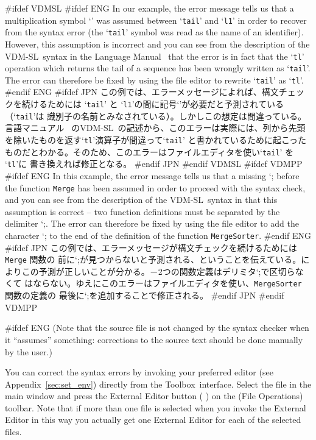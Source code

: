 \documentclass[\pformat,12pt]{article}
\newcommand{\vdmslpp}{VDM-SL}
\newcommand{\Toolbox}{Toolbox}
\newcommand{\vdmslpp}{VDM++}
\newcommand{\Toolbox}{Toolbox}
\newcommand{\Lit}[1]{`#1\Quote}
\newcommand{\aaa}{\tt }
\newcommand{\guicmd}[1]{{\sf #1}}
\newcommand{\guicmd}[1]{{\gt #1}}
\begin{document}
#ifdef VDMSL
#ifdef ENG
In our example, the error message tells us that a multiplication symbol
`{\tt*}' was assumed between `{\tt tail}' and `{\tt l1}' in order to
recover from the syntax error (the `{\tt tail}' symbol was read as the
name of an identifier). However, this assumption is incorrect and  you
can see from the  description of the \vdmslpp\ syntax in the Language
Manual~\cite{LangMan-CSK} that the error is in fact that the `{\tt tl}'
operation which returns the tail of a sequence has been wrongly
written as `{\tt tail}'. The error can therefore be fixed by using the
file editor to rewrite `{\tt tail}' as `{\tt tl}'.
#endif ENG
#ifdef JPN
この例では、エラーメッセージによれば、構文チェックを続けるためには
`{\tt tail}' と `{\tt l1}'の間に記号`{\tt*}'が必要だと予測されている（`{\tt tail}'は
識別子の名前とみなされている）。しかしこの想定は間違っている。言語マニュアル~\cite{LangMan-CSK} 
の\vdmslpp\ の記述から、このエラーは実際には、列から先頭を除いたものを返す`{\tt tl}'演算子が間違って`{\tt tail}'
と書かれているために起こったものだとわかる。そのため、このエラーはファイルエディタを使い`{\tt tail}' を `{\tt tl}'に
書き換えれば修正となる。
#endif JPN
#endif VDMSL
#ifdef VDMPP
#ifdef ENG
In this example, the error message tells us that a missing \Lit{;}
before the function {\aaa Merge} has been assumed in order to proceed
with the syntax check, and you can see from the  description of the
\vdmslpp\ syntax in \cite{LangManPP-CSK} that this assumption is correct
-- two function definitions must be separated by the delimiter
\Lit{;}. The error can therefore be fixed by using the file editor to
add the character \Lit{;} to the end of the definition of the function
{\aaa MergeSorter}.
#endif ENG
#ifdef JPN
この例では、エラーメッセージが構文チェックを続けるためには{\aaa Merge} 関数の
前に\Lit{;}が見つからないと予測される、ということを伝えている。\cite{LangManPP-CSK}に
よりこの予測が正しいことが分かる。－2つの関数定義はデリミタ\Lit{;}で区切らなくて
はならない。ゆえにこのエラーはファイルエディタを使い、{\aaa MergeSorter} 関数の定義の
最後に\Lit{;}を追加することで修正される。
#endif JPN
#endif VDMPP

#ifdef ENG
(Note that the source file is not  changed by the syntax checker when
it ``assumes'' something: corrections to the source text should be
done manually by the user.)

You can correct the syntax errors by invoking your preferred editor
(see Appendix~\ref{sec:set_env}) directly from the \Toolbox\
interface. Select the file  in the main window and 
press the \guicmd{External Editor}\index{External Editor} button (%
\raisebox{-0.8mm}{\texttt{[image: externaleditor.png]}}) 
on the (\guicmd{File Operations}) toolbar. Note that if more than
one file is selected when you invoke the \guicmd{External Editor} in
this way you actually get one \guicmd{External Editor} for each of the
selected files.
\end{document}
